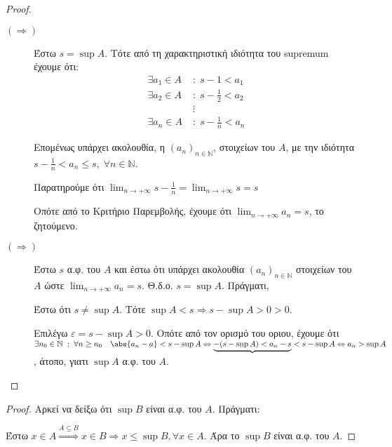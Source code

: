 \documentclass[main.tex]{subfiles}
\begin{document}
\begin{proof}
\item {}
  \begin{description}
    \item [$ (\Rightarrow) $]
      Έστω $ s = \sup A $. Τότε από τη χαρακτηριστική ιδιότητα του supremum έχουμε ότι:
      \begin{align*}
        \exists a_{1} \in A \; &: \; s - 1 < a_{1} \\
        \exists a_{2} \in A \; &: \; s - \frac{1}{2}  < a_{2} \\
                               &\vdots \\
        \exists a_{n} \in A \; &: \; s - \frac{1}{n}  < a_{n} 
      \end{align*} 

      Επομένως υπάρχει ακολουθία, η $ (a_{n})_{n \in \mathbb{N}} $, στοιχείων του $A$, 
      με την ιδιότητα $ s - \frac{1}{n} < a_{n} \leq s, \; \forall n \in \mathbb{N}$. 

      Παρατηρούμε ότι $ \lim_{n \to +\infty} s- \frac{1}{n} = \lim_{n \to +\infty} s = s $ 

      Οπότε από το Κριτήριο Παρεμβολής, έχουμε ότι $ \lim_{n \to +\infty} a_{n}= s $, 
      το ζητούμενο.

    \item [$ (\Rightarrow) $]
      Έστω $ s $ α.φ. του $A$ και έστω ότι υπάρχει ακολουθία $ (a_{n})_{n \in \mathbb{N}} $ 
      στοιχείων του $A$ ώστε $ \lim_{n \to +\infty} a_{n}= s$. Θ.δ.ο. $ s = \sup A $. 
      Πράγματι, 

      Έστω ότι $ s \neq \sup A $. Τότε $ \sup A < s \Rightarrow s - \sup A > 0 > 0 $. 

      Επιλέγω $ \varepsilon = s - \sup A >0 $. Οπότε από τον ορισμό του οριου, έχουμε ότι 
      $ \exists n_{0} \in \mathbb{N} \; : \; \forall n \geq n_{0} \quad \abs{a_{n} - a} < 
      s - \sup A \Leftrightarrow \underbrace{-(s - \sup A) < a_{n} - s} < s - \sup A 
      \Leftrightarrow a_{n} > \sup A$, άτοπο, γιατι $ \sup A $ α.φ. του $A$.
  \end{description}
\end{proof}




\begin{proof}
\item {}
  Αρκεί να δείξω ότι $ \sup B $ είναι α.φ. του $A$. Πράγματι:

  Έστω $ x \in A \overset{A \subseteq B}{\Rightarrow } x \in B \Rightarrow 
  x \leq \sup B, \forall x \in A$. Άρα το $ \sup B $ είναι α.φ. του $A$.
\end{proof}
\end{document}
